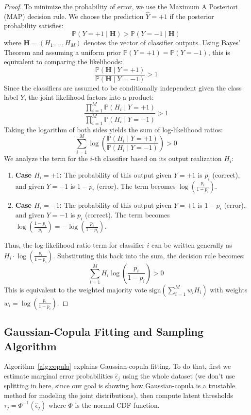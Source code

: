 \documentclass{article}
\theoremstyle{plain}
\theoremstyle{definition}
\theoremstyle{remark}
\begin{document}
\begin{proof}
To minimize the probability of error, we use the Maximum A Posteriori (MAP) decision rule. We choose the prediction $\hat{Y} = +1$ if the posterior probability satisfies:
\[
\mathbb{P}(Y=+1 \mid \mathbf{H}) > \mathbb{P}(Y=-1 \mid \mathbf{H})
\]
where $\mathbf{H} = (H_1, \dots, H_M)$ denotes the vector of classifier outputs. Using Bayes' Theorem \citep{hajek2020probability} and assuming a uniform prior $\mathbb{P}(Y=+1) = \mathbb{P}(Y=-1)$, this is equivalent to comparing the likelihoods:
\[
\frac{\mathbb{P}(\mathbf{H} \mid Y=+1)}{\mathbb{P}(\mathbf{H} \mid Y=-1)} > 1
\]
Since the classifiers are assumed to be conditionally independent given the class label $Y$, the joint likelihood factors into a product:
\[
\frac{\prod_{i=1}^M \mathbb{P}(H_i \mid Y=+1)}{\prod_{i=1}^M \mathbb{P}(H_i \mid Y=-1)} > 1
\]
Taking the logarithm of both sides yields the sum of log-likelihood ratios:
\[
\sum_{i=1}^M \log\left( \frac{\mathbb{P}(H_i \mid Y=+1)}{\mathbb{P}(H_i \mid Y=-1)} \right) > 0
\]
We analyze the term for the $i$-th classifier based on its output realization $H_i$:
\begin{enumerate}
    \item \textbf{Case $H_i = +1$:} The probability of this output given $Y=+1$ is $p_i$ (correct), and given $Y=-1$ is $1-p_i$ (error). The term becomes $\log\left(\frac{p_i}{1-p_i}\right)$.
    \item \textbf{Case $H_i = -1$:} The probability of this output given $Y=+1$ is $1-p_i$ (error), and given $Y=-1$ is $p_i$ (correct). The term becomes $\log\left(\frac{1-p_i}{p_i}\right) = -\log\left(\frac{p_i}{1-p_i}\right)$.
\end{enumerate}
Thus, the log-likelihood ratio term for classifier $i$ can be written generally as $H_i \cdot \log\left(\frac{p_i}{1-p_i}\right)$. Substituting this back into the sum, the decision rule becomes:
\[
\sum_{i=1}^M H_i \log\left(\frac{p_i}{1 - p_i}\right) > 0
\]
This is equivalent to the weighted majority vote $\mathrm{sign}\left(\sum_{i=1}^M w_i H_i\right)$ with weights $w_i = \log\left(\frac{p_i}{1-p_i}\right)$.
\end{proof}
\newpage
\subsection{Gaussian-Copula Fitting and Sampling Algorithm}

Algorithm~\ref{alg:copula} explains Gaussian-copula fitting. To do that, first we estimate marginal error probabilities $\hat{\epsilon}_j$ using the whole dataset (we don't use splitting in here, since our goal is showing how Gaussian-copula is a trustable method for modeling the joint distributions), then compute latent thresholds $\tau_j = \Phi^{-1}(\hat{\epsilon}_j)$ where $\Phi$ is the normal CDF function.
\end{document}
